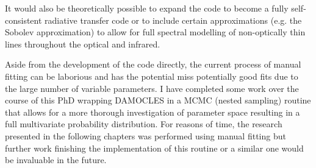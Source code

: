 It would also be theoretically possible to expand the code to become a fully self-consistent radiative transfer code or to include certain approximations (e.g. the Sobolev approximation) to allow for full spectral modelling of non-optically thin lines throughout the optical and infrared.

Aside from the development of the code directly, the current process of manual fitting can be laborious and has the potential miss potentially good fits due to the large number of variable parameters.  I have completed some work over the course of this PhD wrapping DAMOCLES in a MCMC (nested sampling) routine that allows for a more thorough investigation of parameter space resulting in a full multivariate probability distribution.  For reasons of time, the research presented in the following chapters was performed using manual fitting but further work finishing the implementation of this routine or a similar one would be invaluable in the future.





